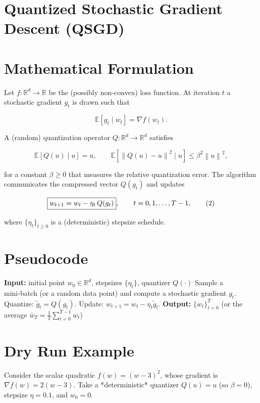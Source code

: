 \documentclass{article}
\newcommand{\E}{\mathbb{E}}
\newcommand{\norm}[1]{\left\lVert#1\right\rVert}
\begin{document}
\section*{Quantized Stochastic Gradient Descent (QSGD)}

\section*{Mathematical Formulation}
Let $f:\mathbb{R}^{d}\rightarrow\mathbb{R}$ be the (possibly non‑convex) loss function.  
At iteration $t$ a stochastic gradient $g_{t}$ is drawn such that  

\[
\E\!\left[g_{t}\mid w_{t}\right]=\nabla f(w_{t}) .
\]

A (random) quantization operator $Q:\mathbb{R}^{d}\rightarrow\mathbb{R}^{d}$ satisfies  

\[
\E\!\left[Q(u)\mid u\right]=u,\qquad 
\E\!\left[\norm{Q(u)-u}^{2}\mid u\right]\leq \beta^{2}\norm{u}^{2},
\tag{1}
\]

for a constant $\beta\ge 0$ that measures the relative quantization error.  
The algorithm communicates the compressed vector $Q(g_{t})$ and updates

\[
\boxed{%
w_{t+1}=w_{t}-\eta_{t}\,Q(g_{t})},
\qquad t=0,1,\dots,T-1,
\tag{2}
\]

where $\{\eta_{t}\}_{t\ge0}$ is a (deterministic) stepsize schedule.

\section*{Pseudocode}
\begin{algorithm}[H]
\caption{Quantized Stochastic Gradient Descent (QSGD)}
\begin{algorithmic}[1]
\STATE \textbf{Input:} initial point $w_{0}\in\mathbb{R}^{d}$, stepsizes $\{\eta_{t}\}$, quantizer $Q(\cdot)$
    \STATE Sample a mini‑batch (or a random data point) and compute a stochastic gradient $g_{t}$.
    \STATE Quantize: $\tilde g_{t}=Q(g_{t})$.
    \STATE Update: $w_{t+1}=w_{t}-\eta_{t}\tilde g_{t}$.
\ENDFOR
\STATE \textbf{Output:} $\{w_{t}\}_{t=0}^{T}$ (or the average $\bar w_{T}= \tfrac1T\sum_{t=0}^{T-1}w_{t}$)
\end{algorithmic}
\end{algorithm}

\section*{Dry Run Example}
Consider the scalar quadratic $f(w)=(w-3)^{2}$, whose gradient is $\nabla f(w)=2(w-3)$.  
Take a *deterministic* quantizer $Q(u)=u$ (so $\beta=0$), stepsize $\eta=0.1$, and $w_{0}=0$.
\end{document}

